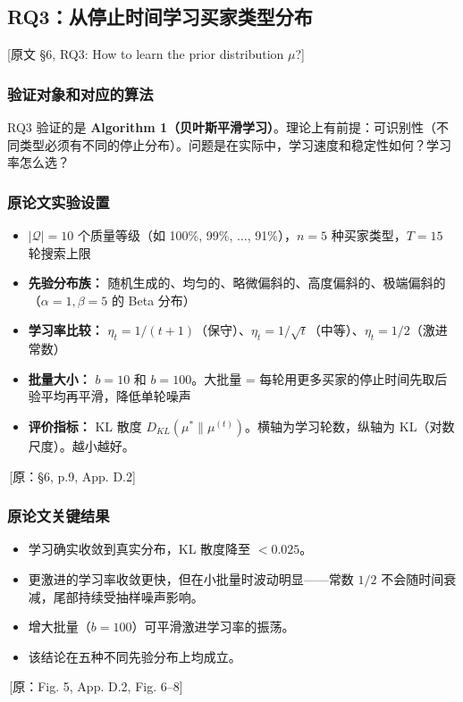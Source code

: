 \documentclass[12pt,a4paper]{article}
\newcommand{\srcref}[1]{\textcolor{black!65}{\footnotesize\,[原：#1]}}
\newcommand{\secref}[1]{\hspace{0.6em} \textcolor{black!80}{\footnotesize [原文 #1]}}
\theoremstyle{definition}
\begin{document}
\subsection{RQ3：从停止时间学习买家类型分布}
\secref{§6, RQ3: How to learn the prior distribution $\mu$?}

\subsubsection{验证对象和对应的算法}

RQ3 验证的是 \textbf{Algorithm 1（贝叶斯平滑学习）}。理论上有前提：可识别性（不同类型必须有不同的停止分布）。问题是在实际中，学习速度和稳定性如何？学习率怎么选？

\subsubsection{原论文实验设置}

\begin{itemize}[leftmargin=*]
    \item $|\mathcal{Q}| = 10$ 个质量等级（如 100\%, 99\%, $\dots$, 91\%），$n = 5$ 种买家类型，$T = 15$ 轮搜索上限
    \item \textbf{先验分布族：} 随机生成的、均匀的、略微偏斜的、高度偏斜的、极端偏斜的（$\alpha=1,\beta=5$ 的 Beta 分布）
    \item \textbf{学习率比较：} $\eta_t = 1/(t+1)$（保守）、$\eta_t = 1/\sqrt{t}$（中等）、$\eta_t = 1/2$（激进常数）
    \item \textbf{批量大小：} $b = 10$ 和 $b = 100$。大批量 = 每轮用更多买家的停止时间先取后验平均再平滑，降低单轮噪声
    \item \textbf{评价指标：} KL 散度 $D_{KL}(\mu^* \| \mu^{(t)})$。横轴为学习轮数，纵轴为 KL（对数尺度）。越小越好。
\end{itemize}
\srcref{§6, p.9, App. D.2}

\subsubsection{原论文关键结果}

\begin{itemize}[leftmargin=*]
    \item 学习确实收敛到真实分布，KL 散度降至 $< 0.025$。
    \item 更激进的学习率收敛更快，但在小批量时波动明显——常数 $1/2$ 不会随时间衰减，尾部持续受抽样噪声影响。
    \item 增大批量（$b = 100$）可平滑激进学习率的振荡。
    \item 该结论在五种不同先验分布上均成立。
\end{itemize}
\srcref{Fig. 5, App. D.2, Fig. 6--8}
\end{document}
